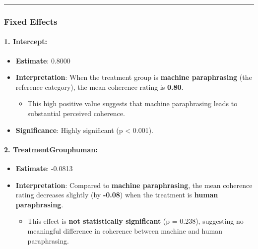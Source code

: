 \documentclass[
]{article}
\providecommand{\tightlist}{%
  \setlength{\itemsep}{0pt}\setlength{\parskip}{0pt}}
\begin{document}
\begin{center}\rule{0.5\linewidth}{0.5pt}\end{center}

\subsubsection{\texorpdfstring{\textbf{Fixed
Effects}}{Fixed Effects}}\label{fixed-effects-5}

\paragraph{\texorpdfstring{\textbf{1.
Intercept:}}{1. Intercept:}}\label{intercept-5}

\begin{itemize}
\tightlist
\item
  \textbf{Estimate}: 0.8000
\item
  \textbf{Interpretation}: When the treatment group is \textbf{machine
  paraphrasing} (the reference category), the mean coherence rating is
  \textbf{0.80}.

  \begin{itemize}
  \tightlist
  \item
    This high positive value suggests that machine paraphrasing leads to
    substantial perceived coherence.
  \end{itemize}
\item
  \textbf{Significance}: Highly significant (p \textless{} 0.001).
\end{itemize}

\paragraph{\texorpdfstring{\textbf{2.
TreatmentGrouphuman:}}{2. TreatmentGrouphuman:}}\label{treatmentgrouphuman-2}

\begin{itemize}
\tightlist
\item
  \textbf{Estimate}: -0.0813
\item
  \textbf{Interpretation}: Compared to \textbf{machine paraphrasing},
  the mean coherence rating decreases slightly (by \textbf{-0.08}) when
  the treatment is \textbf{human paraphrasing}.

  \begin{itemize}
  \tightlist
  \item
    This effect is \textbf{not statistically significant} (p = 0.238),
    suggesting no meaningful difference in coherence between machine and
    human paraphrasing.
  \end{itemize}
\end{itemize}
\end{document}
